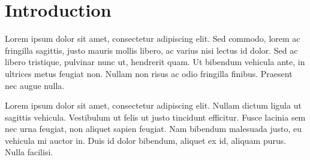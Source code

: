 \documentclass[12pt, twoside]{article}
\begin{document}
\section{Introduction}

Lorem ipsum dolor sit amet, consectetur adipiscing elit. Sed commodo, lorem ac fringilla sagittis, justo mauris mollis libero, ac varius nisi lectus id dolor. Sed ac libero tristique, pulvinar nunc ut, hendrerit quam. Ut bibendum vehicula ante, in ultrices metus feugiat non. Nullam non risus ac odio fringilla finibus. Praesent nec augue nulla.

\vspace{4cm}

Lorem ipsum dolor sit amet, consectetur adipiscing elit. Nullam dictum ligula ut sagittis vehicula. Vestibulum ut felis ut justo tincidunt efficitur. \hspace{1cm} Fusce lacinia sem nec urna feugiat, non aliquet sapien feugiat. Nam bibendum malesuada justo, eu vehicula mi auctor in. Duis id dolor bibendum, aliquet ex id, aliquam purus. Nulla facilisi.
\end{document}
